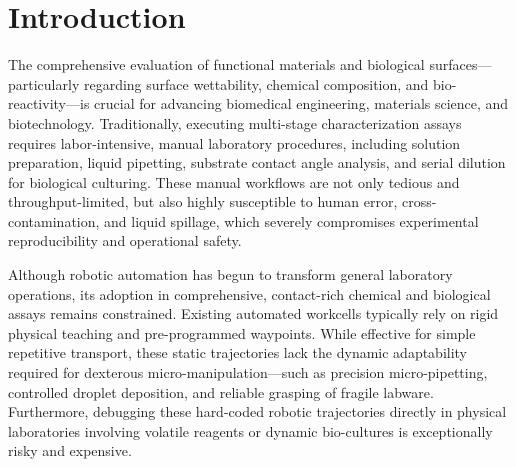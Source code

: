 \documentclass[journal,twocolumn]{IEEEtran}
\begin{document}

\section{Introduction}
\label{sec:introduction}

The comprehensive evaluation of functional materials and biological surfaces---particularly regarding surface wettability, chemical composition, and bio-reactivity---is crucial for advancing biomedical engineering, materials science, and biotechnology. Traditionally, executing multi-stage characterization assays requires labor-intensive, manual laboratory procedures, including solution preparation, liquid pipetting, substrate contact angle analysis, and serial dilution for biological culturing. These manual workflows are not only tedious and throughput-limited, but also highly susceptible to human error, cross-contamination, and liquid spillage, which severely compromises experimental reproducibility and operational safety.

Although robotic automation has begun to transform general laboratory operations, its adoption in comprehensive, contact-rich chemical and biological assays remains constrained. Existing automated workcells typically rely on rigid physical teaching and pre-programmed waypoints. While effective for simple repetitive transport, these static trajectories lack the dynamic adaptability required for dexterous micro-manipulation---such as precision micro-pipetting, controlled droplet deposition, and reliable grasping of fragile labware. Furthermore, debugging these hard-coded robotic trajectories directly in physical laboratories involving volatile reagents or dynamic bio-cultures is exceptionally risky and expensive.
\end{document}
